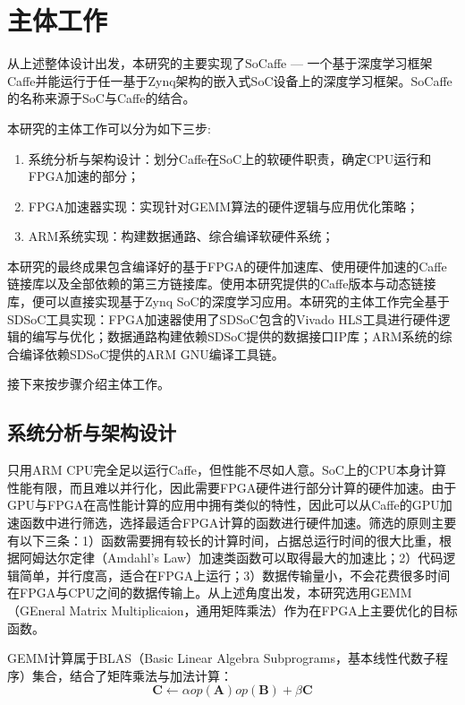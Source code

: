 \chapter{主体工作}

从上述整体设计出发，本研究的主要实现了SoCaffe — 一个基于深度学习框架Caffe并能运行于任一基于Zynq架构的嵌入式SoC设备上的深度学习框架。SoCaffe的名称来源于SoC与Caffe的结合。

本研究的主体工作可以分为如下三步:
\begin{enumerate}
\item 系统分析与架构设计：划分Caffe在SoC上的软硬件职责，确定CPU运行和FPGA加速的部分；
\item FPGA加速器实现：实现针对GEMM算法的硬件逻辑与应用优化策略；
\item ARM系统实现：构建数据通路、综合编译软硬件系统；
\end{enumerate}

本研究的最终成果包含编译好的基于FPGA的硬件加速库、使用硬件加速的Caffe链接库以及全部依赖的第三方链接库。使用本研究提供的Caffe版本与动态链接库，便可以直接实现基于Zynq SoC的深度学习应用。本研究的主体工作完全基于SDSoC工具实现：FPGA加速器使用了SDSoC包含的Vivado HLS工具进行硬件逻辑的编写与优化；数据通路构建依赖SDSoC提供的数据接口IP库；ARM系统的综合编译依赖SDSoC提供的ARM GNU编译工具链。

接下来按步骤介绍主体工作。

\section{系统分析与架构设计}

只用ARM CPU完全足以运行Caffe，但性能不尽如人意。SoC上的CPU本身计算性能有限，而且难以并行化，因此需要FPGA硬件进行部分计算的硬件加速。由于GPU与FPGA在高性能计算的应用中拥有类似的特性，因此可以从Caffe的GPU加速函数中进行筛选，选择最适合FPGA计算的函数进行硬件加速。筛选的原则主要有以下三条：1）函数需要拥有较长的计算时间，占据总运行时间的很大比重，根据阿姆达尔定律（Amdahl's Law）加速类函数可以取得最大的加速比；2）代码逻辑简单，并行度高，适合在FPGA上运行；3）数据传输量小，不会花费很多时间在FPGA与CPU之间的数据传输上。从上述角度出发，本研究选用GEMM（GEneral Matrix Multiplicaion，通用矩阵乘法）作为在FPGA上主要优化的目标函数。

GEMM计算属于BLAS（Basic Linear Algebra Subprograms，基本线性代数子程序）集合，结合了矩阵乘法与加法计算：
\begin{equation}\label{eq:gemm}
\mathbf{C} \leftarrow \alpha op(\mathbf{A})op(\mathbf{B}) + \beta \mathbf{C}
\end{equation}

